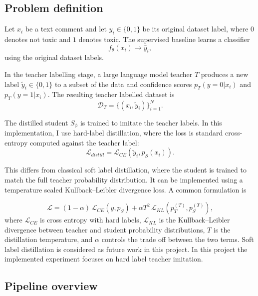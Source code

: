 \documentclass[pdflatex,sn-mathphys-num]{sn-jnl}
\begin{document}
\subsection{Problem definition}

Let $x_i$ be a text comment and let $y_i \in \{0,1\}$ be its original dataset label, where $0$ denotes not toxic and $1$ denotes toxic. 
The supervised baseline learns a classifier
\begin{equation}
    f_{\theta}(x_i) \rightarrow \hat{y}_i,
\end{equation}
using the original dataset labels. 


In the teacher labelling stage, a large language model teacher $T$ produces a new label $\tilde{y}_i \in \{0,1\}$ to a subset of the data and confidence scores $p_T(y=0|x_i)$ and $p_T(y=1|x_i)$. 
The resulting teacher labelled dataset is
\begin{equation}
    \mathcal{D}_T = \{(x_i, \tilde{y}_i)\}_{i=1}^{N}.
\end{equation}

The distilled student $S_{\phi}$ is trained to imitate the teacher labels. In this implementation, I use hard-label distillation, where the loss is standard cross-entropy computed against the teacher label:
\begin{equation}
    \mathcal{L}_{distill}
    =
    \mathcal{L}_{CE}(\tilde{y}_i, p_S(x_i)).
\end{equation}

This differs from classical soft label distillation, where the student is trained to match the full teacher probability distribution. 
It can be implemented using a temperature scaled Kullback--Leibler divergence loss.
A common formulation is

\begin{equation}
    \mathcal{L} = (1 - \alpha)\,\mathcal{L}_{CE}(y, p_S) + \alpha T^2\,\mathcal{L}_{KL}(p_T^{(T)}, p_S^{(T)}),
\end{equation}
where $\mathcal{L}_{CE}$ is cross entropy with hard labels, $\mathcal{L}_{KL}$ is the Kullback--Leibler divergence between teacher and student probability distributions, $T$ is the distillation temperature, and $\alpha$ controls the trade off between the two terms.
Soft label distillation is considered as future work in this project.
In this project the implemented experiment focuses on hard label teacher imitation.

\subsection{Pipeline overview}
\end{document}
